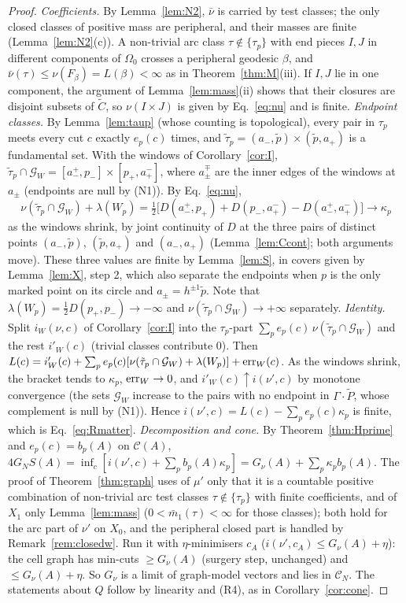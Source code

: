 \documentclass[aps,prd,onecolumn,superscriptaddress,nofootinbib,amsmath,amssymb,11pt]{revtex4-2}
\theoremstyle{definition}
\newcommand{\Cut}{\mathcal{C}}
\newcommand{\CN}{\mathcal{C}_N}
\newcommand{\G}{\mathcal{G}}
\newcommand{\mbar}{\bar m}
\newcommand{\Pt}{\tilde P}
\begin{document}
\begin{proof}
\emph{Coefficients.} By Lemma~\ref{lem:N2}, $\bar\nu$ is carried by test classes; the only closed classes of positive mass are peripheral,
and their masses are finite (Lemma~\ref{lem:N2}(c)). A non-trivial arc class
$\tau\notin\{\tau_p\}$ with end pieces $I,J$ in different components of $\Omega_0$ crosses a peripheral geodesic $\beta$, and
$\bar\nu(\tau)\le\nu(F_\beta)=L(\beta)<\infty$ as in Theorem~\ref{thm:M}(iii). If $I,J$ lie in one component, the argument of
Lemma~\ref{lem:mass}(ii) shows that their closures are disjoint subsets of $\tilde C$, so $\nu(I\times J)$ is given by
Eq.~\eqref{eq:nu} and is finite.
\emph{Endpoint classes.} By Lemma~\ref{lem:taup} (whose counting is topological), every pair in $\tau_p$ meets every cut $c$ exactly
$e_p(c)$ times, and $\tilde\tau_p=(a_-,\tilde p)\times(\tilde p,a_+)$ is a fundamental set. With the windows of
Corollary~\ref{cor:I}, $\tilde\tau_p\cap\G_W=[a_-^{+},p_-]\times[p_+,a_+^{-}]$, where $a_\pm^{\mp}$ are the inner edges of the windows at
$a_\pm$ (endpoints are null by (N1)). By Eq.~\eqref{eq:nu},
\[
\nu(\tilde\tau_p\cap\G_W)+\lambda(W_p)=\tfrac12\big[D(a_-^+,p_+)+D(p_-,a_+^-)-D(a_-^+,a_+^-)\big]\longrightarrow\kappa_p
\]
as the windows shrink, by joint continuity of $D$ at the three pairs of distinct points $(a_-,\tilde p)$, $(\tilde p,a_+)$ and
$(a_-,a_+)$ (Lemma~\ref{lem:Ccont}; both arguments move). These three values are finite by Lemma~\ref{lem:S}, in covers given by
Lemma~\ref{lem:X}, step 2, which also separate the endpoints when $p$ is the only marked point on its circle and
$a_\pm=h^{\pm1}\tilde p$. Note that $\lambda(W_p)=\frac12D(p_+,p_-)\to-\infty$ and $\nu(\tilde\tau_p\cap\G_W)\to+\infty$ separately.
\emph{Identity.} Split $i_W(\nu,c)$ of Corollary~\ref{cor:I} into the $\tau_p$-part $\sum_pe_p(c)\,\nu(\tilde\tau_p\cap\G_W)$ and the rest
$i'_W(c)$ (trivial classes contribute $0$). Then
$L(c)=i'_W(c)+\sum_pe_p(c)[\nu(\tilde\tau_p\cap\G_W)+\lambda(W_p)]+{\rm err}_W(c)$. As the windows shrink, the bracket tends to
$\kappa_p$, ${\rm err}_W\to0$, and $i'_W(c)\uparrow i(\nu',c)$ by monotone convergence (the sets $\G_W$ increase to the pairs with no
endpoint in $\Gamma\cdot\Pt$, whose complement is null by (N1)). Hence $i(\nu',c)=L(c)-\sum_pe_p(c)\kappa_p$ is finite, which is
Eq.~\eqref{eq:Rmatter}.
\emph{Decomposition and cone.} By Theorem~\ref{thm:Hprime} and $e_p(c)=b_p(A)$ on $\Cut(A)$,
$4G_NS(A)=\inf_c[i(\nu',c)+\sum_pb_p(A)\kappa_p]=G_\nu(A)+\sum_p\kappa_pb_p(A)$. The proof of Theorem~\ref{thm:graph} uses of $\mu'$ only
that it is a countable positive combination of non-trivial arc test classes $\tau\notin\{\tau_p\}$ with finite coefficients, and of
$X_1$ only Lemma~\ref{lem:mass} ($0<\mbar_1(\tau)<\infty$ for those classes); both hold for the arc part of $\nu'$ on $X_0$, and the
peripheral closed part is handled by Remark~\ref{rem:closedw}. Run it with
$\eta$-minimisers $c_A$ ($i(\nu',c_A)\le G_\nu(A)+\eta$): the cell graph has min-cuts $\ge G_\nu(A)$ (surgery step, unchanged) and
$\le G_\nu(A)+\eta$. So $G_\nu$ is a limit of graph-model vectors and lies in $\CN$. The statements about $Q$ follow by linearity and
(R4), as in Corollary~\ref{cor:cone}.
\end{proof}
\end{document}
